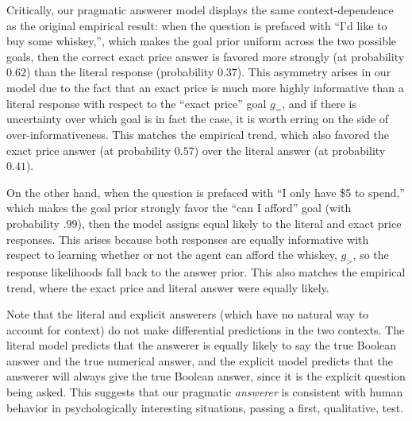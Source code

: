 \documentclass[12pt, floatsintext, jou]{apa6}
\begin{document}
Critically, our pragmatic answerer model displays the same context-dependence as the original empirical result: when the question is prefaced with ``I'd like to buy some whiskey,'', which makes the goal prior uniform across the two possible goals, then the correct exact price answer is favored more strongly (at probability $0.62$) than the literal response (probability $0.37$). This asymmetry arises in our model due to the fact that an exact price is much more highly informative than a literal response with respect to the ``exact price'' goal $g_=$, and if there is uncertainty over which goal is in fact the case, it is worth erring on the side of over-informativeness. This matches the empirical trend, which also favored the exact price answer (at probability $0.57$) over the literal answer (at probability $0.41$).

On the other hand, when the question is prefaced with ``I only have \$5 to spend,'' which makes the goal prior strongly favor the ``can I afford'' goal (with probability $.99$), then the model assigns equal likely to the literal and exact price responses. This arises because both responses are equally informative with respect to learning whether or not the agent can afford the whiskey, $g_>$, so the response likelihoods fall back to the answer prior. This also matches the empirical trend, where the exact price and literal answer were equally likely.

Note that the literal and explicit answerers (which have no natural way to account for context) do not make differential predictions in the two contexts. The literal model predicts that the answerer is equally likely to say the true Boolean answer and the true numerical answer, and the explicit model predicts that the answerer will always give the true Boolean answer, since it is the explicit question being asked. This suggests that our pragmatic \emph{answerer} is consistent with human behavior in psychologically interesting situations, passing a first, qualitative, test. 
\end{document}

